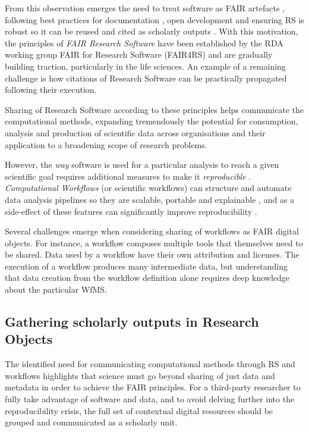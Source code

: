 From this observation emerges the need to treat software as FAIR artefacts \cite{Lamprecht 2019}, following best practices for documentation \cite{Lee 2018}, open development \cite{Prlić 2012} and ensuring \acrfull{RS} is robust \cite{Taschuk 2017} so it can be reused and cited as scholarly outputs \cite{Smith 2016}. 
With this motivation, the principles of \emph{FAIR Research Software} \cite{Katz 2021b} have been established by the \acrfull{RDA} working group FAIR for Research Software (FAIR4RS)  \cite{Barker 2022} and are gradually building traction, particularly in the life sciences.
An example of a remaining challenge is how citations of Research Software can be practically propagated following their execution. 

Sharing of Research Software according to these principles helps communicate the computational methods, expanding tremendously the potential for consumption, analysis and production of scientific data across organisations and their application to a broadening scope of research problems.

However, the \emph{way} software is used for a particular analysis to reach a given scientific goal requires additional measures to make it \emph{reproducible} \cite{Stodden 2016,Sandve 2013}. \emph{Computational Workflows} (or \glspl{scientific workflow}) can structure and automate data analysis pipelines so they are scalable, portable and explainable \cite{Atkinson 2017}, and as a side-effect of these features can significantly improve reproducibility \cite{Cohen-Boulakia 2017}. 

Several challenges emerge when considering sharing of workflows as FAIR digital objects. For instance, a workflow composes multiple tools that themselves need to be shared. Data used by a workflow have their own attribution and licenses. The execution of a workflow produces many intermediate data, but understanding that data creation from the workflow definition alone requires deep knowledge about the particular \acrfull{WfMS}.


\subsection{Gathering scholarly outputs in Research Objects}

The identified need for communicating computational methods through \acrlong{RS} and workflows highlights that science must go beyond sharing of just data and metadata in order to achieve the FAIR principles. For a third-party researcher to fully take advantage of software and data, and to avoid delving further into the reproducibility crisis, the full set of contextual digital resources should be grouped and communicated as a scholarly unit.

